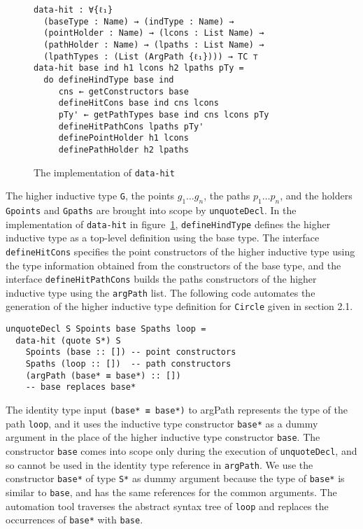 \documentclass[sigplan,10pt]{acmart}
\begin{document}
\begin{figure}
\begin{center}
\begingroup
\begin{Verbatim}
data-hit : ∀{ℓ₁} 
  (baseType : Name) → (indType : Name) →
  (pointHolder : Name) → (lcons : List Name) →
  (pathHolder : Name) → (lpaths : List Name) →
  (lpathTypes : (List (ArgPath {ℓ₁}))) → TC ⊤
data-hit base ind h1 lcons h2 lpaths pTy =
  do defineHindType base ind
     cns ← getConstructors base
     defineHitCons base ind cns lcons
     pTy' ← getPathTypes base ind cns lcons pTy
     defineHitPathCons lpaths pTy'
     definePointHolder h1 lcons
     definePathHolder h2 lpaths
\end{Verbatim}
\endgroup
\end{center}
\caption{The implementation of {\tt data-hit}}
\label{fig:data-hit}
\end{figure}
\normalsize


The higher inductive type \texttt{G}, the points $g_1 \ldots g_n$, the paths $p_1 \ldots p_n$, and the holders \texttt{Gpoints} and \texttt{Gpaths} are brought into scope by {\tt unquoteDecl}. In the implementation of {\tt data-hit} in figure~\ref{fig:data-hit}, {\tt defineHindType} defines the higher inductive type as a top-level definition using the base type. The interface {\tt defineHitCons} specifies the point constructors of the higher inductive type using the type information obtained from the constructors of the base type, and the interface {\tt defineHitPathCons} builds the paths constructors of the higher inductive type using the {\tt argPath} list. The following code automates the generation of the higher inductive type definition for {\tt Circle} given in section 2.1.
\begin{center}
\begingroup
\begin{BVerbatim}
unquoteDecl S Spoints base Spaths loop =
  data-hit (quote S*) S
    Spoints (base :: []) -- point constructors
    Spaths (loop :: [])  -- path constructors
    (argPath (base* ≡ base*) :: []) 
    -- base replaces base*
\end{BVerbatim}
\endgroup
\end{center}

The identity type input {\tt (base* ≡ base*)} to argPath represents the type of the path {\tt loop}, and it uses the inductive type constructor {\tt base*} as a dummy argument in the place of the higher inductive type constructor {\tt base}. The constructor {\tt base} comes into scope only during the execution of {\tt unquoteDecl}, and so cannot be used in the identity type reference in {\tt argPath}. We use the constructor {\tt base*} of type {\tt S*} as dummy argument because the type of {\tt base*} is similar to {\tt base}, and has the same references for the common arguments. The automation tool traverses the abstract syntax tree of {\tt loop} and replaces the occurrences of {\tt base*} with {\tt base}.
\end{document}
